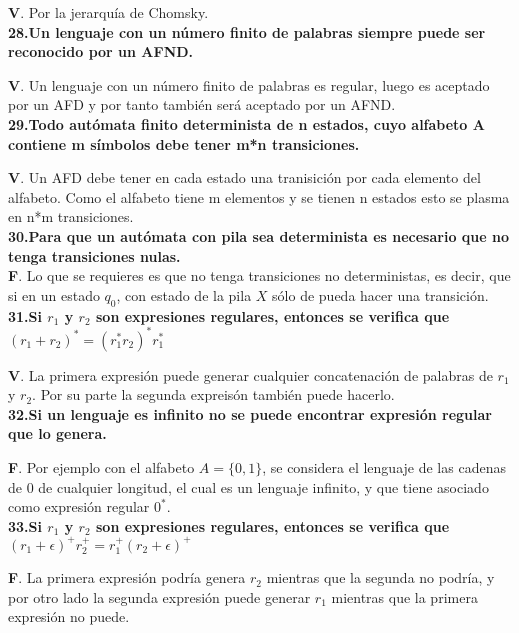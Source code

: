\documentclass[a4paper,11pt]{article}
\begin{document}
\textbf{V}. Por la jerarquía de Chomsky.  \\

\textbf{28.Un lenguaje con un número finito de palabras siempre puede ser reconocido por un AFND.}

\textbf{V}. Un lenguaje con un número finito de palabras es regular, luego es aceptado por un AFD y por tanto también será aceptado por un AFND. \\

\textbf{29.Todo autómata finito determinista de n estados, cuyo alfabeto A contiene m símbolos debe tener m*n transiciones.}

\textbf{V}. Un AFD debe tener en cada estado una tranisición por cada elemento del alfabeto. Como el alfabeto tiene m elementos y se tienen n estados esto se plasma en n*m transiciones. \\

\textbf{30.Para que un autómata con pila sea determinista es necesario que no tenga transiciones nulas.} \\

\textbf{F}. Lo que se requieres es que no tenga transiciones no deterministas, es decir, que si en un estado $q_0$, con estado de la pila $X$ sólo de pueda hacer una transición. \\

\textbf{31.Si $r_1$ y $r_2$ son expresiones regulares, entonces se verifica que $(r_1+r_2)^*=(r_1^*r_2)^*r_1^*$}

\textbf{V}. La primera expresión puede generar cualquier concatenación de palabras de $r_1$ y $r_2$. Por su parte la segunda expreisón también puede hacerlo.  \\

\textbf{32.Si un lenguaje es infinito no se puede encontrar expresión regular que lo genera.}

\textbf{F}. Por ejemplo con el alfabeto $A=\{0,1\}$, se considera el lenguaje de las cadenas de 0 de cualquier longitud, el cual es un lenguaje infinito, y que tiene asociado como expresión regular $0^*$. \\

\textbf{33.Si $r_1$ y $r_2$ son expresiones regulares, entonces se verifica que $(r_1+\epsilon)^+r_2^+=r_1^+(r_2+\epsilon)^+$}

\textbf{F}. La primera expresión podría genera $r_2$ mientras que la segunda no podría, y por otro lado la segunda expresión puede generar $r_1$ mientras que la primera expresión no puede. \\
\end{document}
